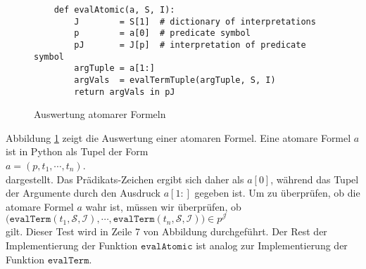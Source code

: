 \begin{figure}[!ht]
\centering
\begin{verbatim}
    def evalAtomic(a, S, I):
        J        = S[1]  # dictionary of interpretations
        p        = a[0]  # predicate symbol
        pJ       = J[p]  # interpretation of predicate symbol
        argTuple = a[1:]
        argVals  = evalTermTuple(argTuple, S, I)
        return argVals in pJ
\end{verbatim}
\vspace*{-0.3cm}
\caption{Auswertung atomarer Formeln}
\label{fig:evalAtomic.ipynb}
\end{figure}

Abbildung \ref{fig:evalAtomic.ipynb} zeigt die Auswertung einer atomaren Formel.  Eine atomare Formel $a$ 
ist in Python als Tupel der Form
\\[0.2cm]
\hspace*{1.3cm}
$a = (p, t_1,\cdots,t_n)$.
\\[0.2cm]
dargestellt.  Das Prädikats-Zeichen ergibt sich daher als $a[0]$, während das Tupel der Argumente durch den
Ausdruck $a[1:]$ gegeben ist.  Um zu überprüfen, ob die atomare Formel $a$ wahr ist, müssen wir überprüfen, ob
\\[0.2cm]
\hspace*{1.3cm}
$\bigl(\texttt{evalTerm}(t_1,\mathcal{S}, \mathcal{I}), \cdots, \texttt{evalTerm}(t_n,\mathcal{S},\mathcal{I})\bigr)\in p^\mathcal{J}$
\\[0.2cm]
gilt.  Dieser Test wird in Zeile 7 von Abbildung durchgeführt. Der Rest der Implementierung der Funktion
$\texttt{evalAtomic}$ ist analog zur Implementierung der Funktion $\texttt{evalTerm}$.



